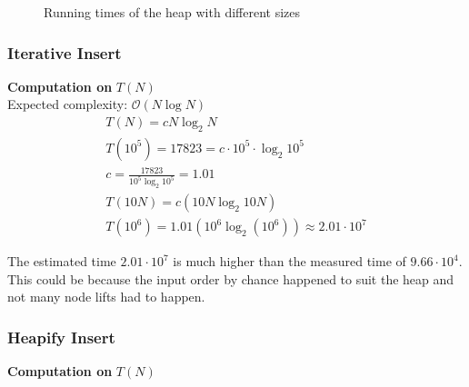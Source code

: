 \documentclass{article}
\begin{document}
\begin{figure}[!ht]
    \centering
{}\datatable
{}
\caption{Running times of the heap with different sizes}
\label{plot:heap}
\end{figure}

\subsubsection{Iterative Insert}
\textbf{Computation on} $T(N)$ \\

Expected complexity: $\mathcal{O}(N \log N)$ \\

\[
\begin{gathered}
    T(N) = c N \log_2 N \\
    T(10^5) = 17823 = c \cdot 10^5 \cdot \log_2 10^5 \\
    c = \frac{17823}{10^5 \log_2 10^5} = 1.01 \\
    T(10N) = c(10N \log_2 10N) \\
    T(10^6) = 1.01 (10^6 \log_2 (10^6)) \approx 2.01 \cdot 10^7
\end{gathered}
\]

The estimated time $2.01 \cdot 10^7$ is much higher than the measured time of $9.66 \cdot 10^4$. This could be because the input order by chance happened to suit the heap and not many node lifts had to happen.

\subsubsection{Heapify Insert}
\textbf{Computation on} $T(N)$ \\
\end{document}
